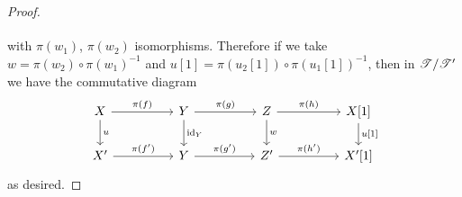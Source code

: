 \documentclass[dissertation.tex]{subfiles}
\begin{document}
\begin{lem}
\begin{proof}
$$\begin{tikzcd}
    \end{tikzcd}$$
    with $\pi(w_1)$, $\pi(w_2)$ isomorphisms.
    Therefore if we take $w = \pi(w_2) \circ \pi(w_1)^{-1}$ and $u[1] = \pi(u_2[1]) \circ \pi(u_1[1])^{-1}$, then in $\mathscr{T}/\mathscr{T}^\prime$ we have the commutative diagram
    $$\begin{tikzcd}
      X \arrow{rr}{\pi(f)}\arrow{d}{u} && Y \arrow{rr}{\pi(g)}\arrow{d}{\id_Y} && Z \arrow{rr}{\pi(h)}\arrow{d}{w} && X[1]\arrow{d}{u[1]}\\
        X^\prime \arrow{rr}{\pi(f^\prime)} && Y \arrow{rr}{\pi(g^{\prime})} && Z^\prime \arrow{rr}{\pi(h^{\prime})} && X^\prime[1]
    \end{tikzcd}$$
    as desired.
    
  \end{proof}
\end{lem}
\end{document}
